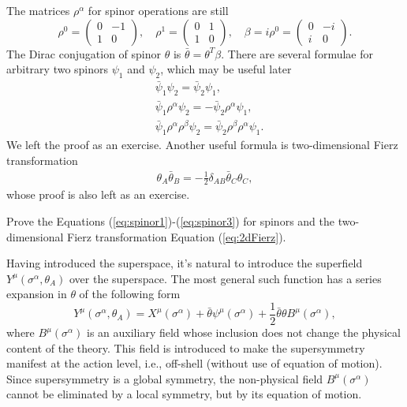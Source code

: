 \documentclass[graybox,envcountchap,sectrefs]{svmono}
\begin{document}
The matrices $\rho^{\alpha}$ for spinor operations are still
\begin{equation}
\rho^0=\left(\begin{array}{cc}
0 & -1\\
1 & 0	
\end{array}
\right), \quad 	\rho^1=\left(\begin{array}{cc}
0 & 1\\
1 & 0	
\end{array}
\right),\quad \beta=i\rho^0=\left(\begin{array}{cc}
0 & -i\\
i & 0	
\end{array}
\right).
\end{equation}
The Dirac conjugation of spinor $\theta$ is $\bar{\theta}=\theta^{T}\beta$. There are several formulae for arbitrary two spinors $\psi_1$ and $\psi_2$, which may be useful later
 \begin{align}
 &\bar{\psi}_1\psi_2=\bar{\psi}_2\psi_1, \label{eq:spinor1} \\
 &\bar{\psi}_1\rho^{\alpha}\psi_2 =- \bar{\psi}_2\rho^{\alpha}\psi_1,\label{eq:spinor2}\\
 &\bar{\psi}_1\rho^{\alpha}\rho^{\beta}\psi_2=\bar{\psi}_2\rho^{\beta}\rho^{\alpha}\psi_1.\label{eq:spinor3}
 \end{align}
We left the proof as an exercise. Another useful formula is two-dimensional Fierz transformation
 \begin{align}
 \theta_{A} \bar{\theta}_{B}=-\frac{1}{2} \delta_{A B} \bar{\theta}_{C} \theta_{C}, \label{eq:2dFierz}
 \end{align}
whose proof is also left as an exercise.

\begin{exercise}
Prove the Equations (\ref{eq:spinor1})-(\ref{eq:spinor3}) for spinors and the two-dimensional Fierz transformation	 Equation (\ref{eq:2dFierz}).
\end{exercise}




Having introduced the superspace, it's natural to introduce the superfield $Y^{\mu}(\sigma^{\alpha},\theta_A)$ over the superspace. The most general such function has a series expansion in $\theta$ of the following form
\begin{equation}
\boxed{Y^{\mu}(\sigma^{\alpha},\theta_A)=X^{\mu}(\sigma^{\alpha})+\bar{\theta}\psi^{\mu}(\sigma^{\alpha})+\frac{1}{2}\bar{\theta}\theta B^{\mu}(\sigma^{\alpha}),}
\end{equation}
where $B^{\mu}(\sigma^{\alpha})$ is an auxiliary field whose inclusion does not change the physical content of the theory. 
This field is introduced to make the supersymmetry manifest at the action level, i.e., off-shell (without use of equation of motion). 
Since supersymmetry is a global symmetry, the non-physical field $B^{\mu}(\sigma^{\alpha})$  cannot be eliminated by a local symmetry, but by its equation of motion.
\end{document}
